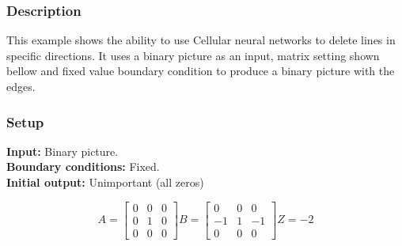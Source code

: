 \subsubsection{Description}
This example shows the ability to use Cellular neural networks to delete lines in specific directions. It uses a binary picture as an input, matrix setting shown bellow and fixed value boundary condition to produce a binary picture with the edges.
\subsubsection{Setup}

\textbf{Input:} Binary picture.\\
\textbf{Boundary conditions:} Fixed.\\
\textbf{Initial output:} Unimportant (all zeros)

\begin{minipage}{1\linewidth}
\begin{equation}
A =
\begin{bmatrix}
 0 & 0 & 0 \\
 0 & 1 & 0 \\
 0 & 0 & 0
\end{bmatrix}
B =
\begin{bmatrix}
 0 & 0 & 0 \\
 -1 & 1 & -1 \\
 0 & 0 & 0
\end{bmatrix}
Z = -2
\end{equation}
\end{minipage}

